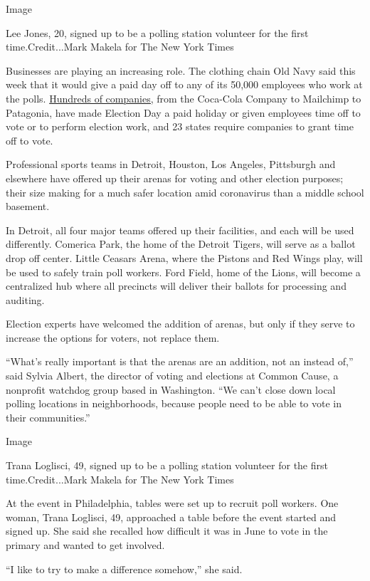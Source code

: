 Image

Lee Jones, 20, signed up to be a polling station volunteer for the first
time.Credit...Mark Makela for The New York Times

Businesses are playing an increasing role. The clothing chain Old Navy
said this week that it would give a paid day off to any of its 50,000
employees who work at the polls.
\href{https://apnews.com/cbb2ff495dcf09875ce87b3a53dcda52}{Hundreds of
companies,} from the Coca-Cola Company to Mailchimp to Patagonia, have
made Election Day a paid holiday or given employees time off to vote or
to perform election work, and 23 states require companies to grant time
off to vote.

Professional sports teams in Detroit, Houston, Los Angeles, Pittsburgh
and elsewhere have offered up their arenas for voting and other election
purposes; their size making for a much safer location amid coronavirus
than a middle school basement.

In Detroit, all four major teams offered up their facilities, and each
will be used differently. Comerica Park, the home of the Detroit Tigers,
will serve as a ballot drop off center. Little Ceasars Arena, where the
Pistons and Red Wings play, will be used to safely train poll workers.
Ford Field, home of the Lions, will become a centralized hub where all
precincts will deliver their ballots for processing and auditing.

Election experts have welcomed the addition of arenas, but only if they
serve to increase the options for voters, not replace them.

``What's really important is that the arenas are an addition, not an
instead of,'' said Sylvia Albert, the director of voting and elections
at Common Cause, a nonprofit watchdog group based in Washington. ``We
can't close down local polling locations in neighborhoods, because
people need to be able to vote in their communities.''

Image

Trana Loglisci, 49, signed up to be a polling station volunteer for the
first time.Credit...Mark Makela for The New York Times

At the event in Philadelphia, tables were set up to recruit poll
workers. One woman, Trana Loglisci, 49, approached a table before the
event started and signed up. She said she recalled how difficult it was
in June to vote in the primary and wanted to get involved.

``I like to try to make a difference somehow,'' she said.

